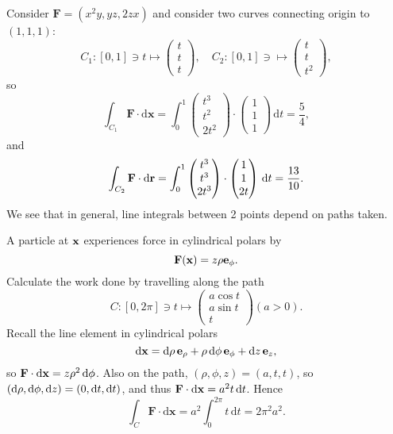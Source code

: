 \begin{example}\label{eg:3.1}
    Consider $ \mathbf{F} = (x^2y,yz,2zx) $ and consider two curves connecting origin to $ (1,1,1) $:
    \[
        C_1: [0,1]\ni t \mapsto \begin{pmatrix}
            t \\ t \\ t
        \end{pmatrix},\quad 
        C_2 : [0,1]\ni \mapsto \begin{pmatrix}
            t \\ t \\ t^2
        \end{pmatrix},
    \]
    so 
    \[
        \int_{C_1} \mathbf{F} \cdot\mathrm{d}\mathbf{x} = \int_{0}^{1} \begin{pmatrix}
            t^3 \\ t^2 \\ 2t^2
        \end{pmatrix}\cdot \begin{pmatrix}
            1 \\ 1 \\ 1
        \end{pmatrix} \,\mathrm{d}t = \frac{5}{4},
    \]
    and 
    \[
        \int_{C_2} {\bf F} \cdot\mathrm{d}\mathbf{r} = \int_{0}^{1} \begin{pmatrix}
            t^3 \\ t^3 \\ 2t^3
        \end{pmatrix}\cdot \begin{pmatrix}
            1 \\ 1 \\ 2t
        \end{pmatrix} \,\mathrm{d}t = \frac{13}{10}.
    \]
    We see that in general, line integrals between 2 points depend on paths taken.
\end{example}
\begin{example}
    A particle at $ {\bf x} $ experiences force in cylindrical polars by
    \[
        \mathbf{F}(\mathbf{x}) = z\rho{\bf e}_\phi.
    \]
    Calculate the work done by travelling along the path
    \[
        C: [0,2\pi]\ni t \mapsto \begin{pmatrix}
            a\cos t \\ a\sin t \\ t
        \end{pmatrix}(a>0).
    \]
    Recall the line element in cylindrical polars
    \[
        \mathrm{d} \mathbf{x} = \mathrm{d} \rho\,{\bf e}_\rho+\rho\,\mathrm{d} \phi\,{\bf e}_\phi+\mathrm{d} z\,{\bf e}_z,
    \]
    so $ \mathbf{F}\cdot \mathrm{d} \mathbf{x} = z\rho^2 \,\mathrm{d}  \phi $. Also on the path, $ (\rho,\phi,z) = (a,t,t) $, so $ (\mathrm{d} \rho,\mathrm{d} \phi,\mathrm{d} z) = (0,\mathrm{d} t,\mathrm{d} t) $, and thus $ \mathbf{F}\cdot \mathrm{d} {\bf x} = a^2t\,\mathrm{d} t $. Hence
    \[
        \int_{C} \mathbf{F} \cdot\mathrm{d}\mathbf{x} = a^2 \int_{0}^{2\pi} t \,\mathrm{d}t = 2\pi^2 a^2.
    \]
\end{example}

